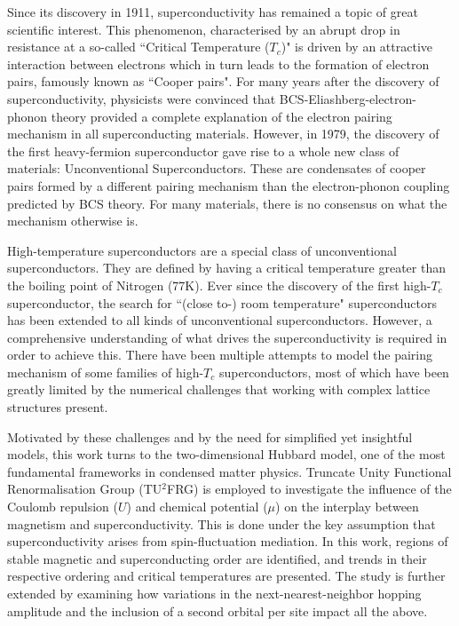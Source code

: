\documentclass[11pt]{article}
\begin{document}
Since its discovery in 1911\cite{onnes1911superconductivity}, superconductivity has remained a topic of great scientific interest.
This phenomenon, characterised by an abrupt drop in resistance at a so-called ``Critical Temperature ($T_c$)"\cite{geballe2015tc} is driven by an attractive interaction
between electrons which in turn leads to the formation of electron pairs, famously known as ``Cooper pairs"\cite{schrieffer2018theory}. For many 
years after the discovery of superconductivity, physicists
were convinced that BCS-Eliashberg-electron-phonon theory \cite{schrieffer2018theory} provided a complete explanation of the electron pairing mechanism in all superconducting materials. 
However, in 1979, the discovery of the first heavy-fermion superconductor\cite{steglich1979superconductivity} gave rise to a whole new class of materials: Unconventional Superconductors. 
These are condensates of cooper pairs formed by a different pairing mechanism than the electron-phonon coupling predicted by BCS theory\cite{hirsch2015superconducting}.
For many materials, there is no consensus on what the mechanism otherwise is\cite{norman2011challenge}.\par

\medskip
\noindent High-temperature superconductors are a special class of unconventional superconductors. They are defined by having a critical temperature greater than the boiling point 
of Nitrogen (77K). Ever since the discovery of the first high-$T_c$ superconductor\cite{bednorz1986possible}, the search for ``(close to-) room temperature" superconductors has been extended to 
all kinds of unconventional superconductors. However, a comprehensive understanding of what drives the superconductivity is required in order 
to achieve this. There have been multiple attempts to model the pairing mechanism of some families of high-$T_c$ superconductors, most of which have
been greatly limited by the numerical challenges that working with complex lattice structures present.\par 

\medskip
\noindent Motivated by these challenges and by the need for simplified yet insightful models, this work turns to the two-dimensional Hubbard model, one of the most fundamental frameworks in condensed matter physics. Truncate Unity Functional Renormalisation Group (TU$^2$FRG)\cite{eckhardt2020truncated} is employed to 
investigate the influence of the Coulomb repulsion ($U$) and chemical potential ($\mu$) on the interplay between magnetism and superconductivity.
This is done under the key assumption that superconductivity arises from spin-fluctuation mediation.
In this work, regions of stable magnetic and superconducting order are identified, and trends in their respective ordering and critical temperatures are presented.
The study is further extended by examining how variations in the next-nearest-neighbor hopping amplitude and the inclusion of a second orbital per site impact all the above.
\end{document}
